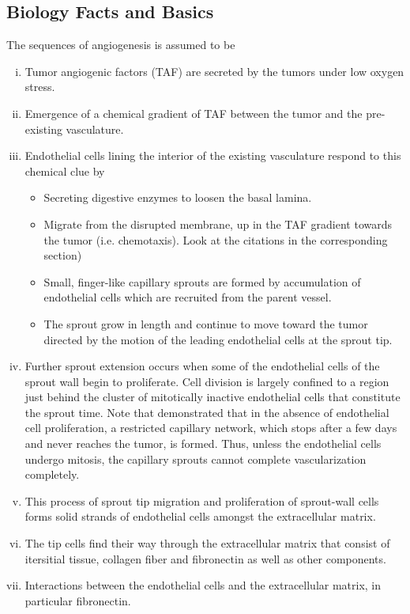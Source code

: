 \subsection{Biology Facts and Basics}
The sequences of angiogenesis is assumed to be
\begin{enumerate}[(i),noitemsep]
	\item Tumor angiogenic factors (TAF) are secreted by the tumors under low oxygen stress. 
	\item Emergence of a chemical gradient of TAF between the tumor and the pre-existing vasculature.
	\item Endothelial cells lining the interior of the existing vasculature respond to this chemical clue by
	\begin{itemize}[noitemsep]
		\item Secreting digestive enzymes to loosen the basal lamina.
		\item Migrate from the disrupted membrane, up in the TAF gradient towards the tumor (i.e. chemotaxis). Look at the citations in the corresponding section)
		\item Small, finger-like capillary sprouts are formed by accumulation of endothelial cells which are recruited from the parent vessel.
		\item The sprout grow in length and continue to move toward the tumor directed by the motion of the leading endothelial cells at the sprout tip.
	\end{itemize} 
	\item Further sprout extension occurs when some of the endothelial cells of the sprout wall begin to proliferate. Cell division is largely confined to a region just behind the cluster of mitotically inactive endothelial cells that constitute the sprout time. Note that \cite{Sholley1984} demonstrated that in the absence of endothelial cell proliferation, a restricted capillary network, which stops after a few days and never reaches the tumor, is formed. Thus, unless the endothelial cells undergo mitosis, the capillary sprouts cannot complete vascularization completely.
	\item This process of sprout tip migration and proliferation of sprout-wall cells forms solid strands of endothelial cells amongst the extracellular matrix.
	\item The tip cells find their way through the extracellular matrix that consist of itersitial tissue, collagen fiber and fibronectin as well as other components.
	\item Interactions between the endothelial cells and the extracellular matrix, in particular fibronectin.

\end{enumerate}
